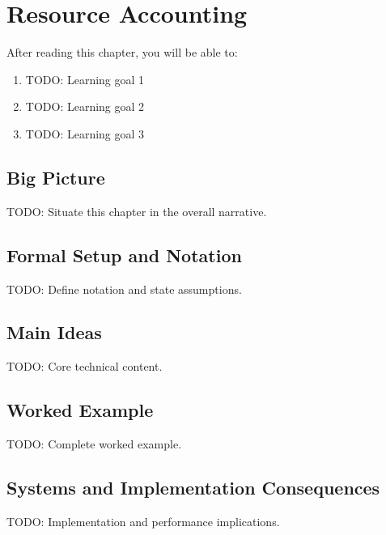 \chapter{Resource Accounting}
\label{ch:14}

\begin{keyinsight}
After reading this chapter, you will be able to:
\begin{enumerate}
  \item TODO: Learning goal 1
  \item TODO: Learning goal 2
  \item TODO: Learning goal 3
\end{enumerate}
\end{keyinsight}

\section{Big Picture}
\label{ch:14:sec:big_picture}

TODO: Situate this chapter in the overall narrative.

\section{Formal Setup and Notation}
\label{ch:14:sec:setup}

TODO: Define notation and state assumptions.

\section{Main Ideas}
\label{ch:14:sec:main}

TODO: Core technical content.

\section{Worked Example}
\label{ch:14:sec:example}

TODO: Complete worked example.

\section{Systems and Implementation Consequences}
\label{ch:14:sec:systems}

TODO: Implementation and performance implications.


